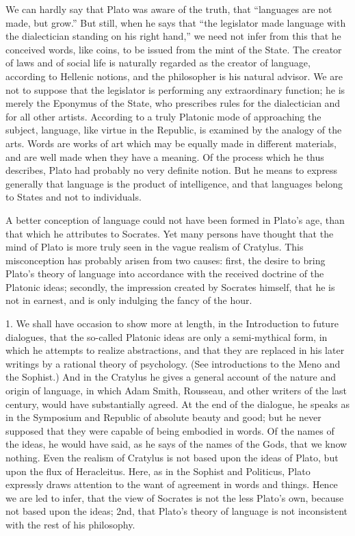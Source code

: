 \documentclass[11pt,letter]{article}
\begin{document}
\par  We can hardly say that Plato was aware of the truth, that “languages are not made, but grow.” But still, when he says that “the legislator made language with the dialectician standing on his right hand,” we need not infer from this that he conceived words, like coins, to be issued from the mint of the State. The creator of laws and of social life is naturally regarded as the creator of language, according to Hellenic notions, and the philosopher is his natural advisor. We are not to suppose that the legislator is performing any extraordinary function; he is merely the Eponymus of the State, who prescribes rules for the dialectician and for all other artists. According to a truly Platonic mode of approaching the subject, language, like virtue in the Republic, is examined by the analogy of the arts. Words are works of art which may be equally made in different materials, and are well made when they have a meaning. Of the process which he thus describes, Plato had probably no very definite notion. But he means to express generally that language is the product of intelligence, and that languages belong to States and not to individuals.

\par  A better conception of language could not have been formed in Plato’s age, than that which he attributes to Socrates. Yet many persons have thought that the mind of Plato is more truly seen in the vague realism of Cratylus. This misconception has probably arisen from two causes: first, the desire to bring Plato’s theory of language into accordance with the received doctrine of the Platonic ideas; secondly, the impression created by Socrates himself, that he is not in earnest, and is only indulging the fancy of the hour.

\par  1. We shall have occasion to show more at length, in the Introduction to future dialogues, that the so-called Platonic ideas are only a semi-mythical form, in which he attempts to realize abstractions, and that they are replaced in his later writings by a rational theory of psychology. (See introductions to the Meno and the Sophist.) And in the Cratylus he gives a general account of the nature and origin of language, in which Adam Smith, Rousseau, and other writers of the last century, would have substantially agreed. At the end of the dialogue, he speaks as in the Symposium and Republic of absolute beauty and good; but he never supposed that they were capable of being embodied in words. Of the names of the ideas, he would have said, as he says of the names of the Gods, that we know nothing. Even the realism of Cratylus is not based upon the ideas of Plato, but upon the flux of Heracleitus. Here, as in the Sophist and Politicus, Plato expressly draws attention to the want of agreement in words and things. Hence we are led to infer, that the view of Socrates is not the less Plato’s own, because not based upon the ideas; 2nd, that Plato’s theory of language is not inconsistent with the rest of his philosophy.
\end{document}
